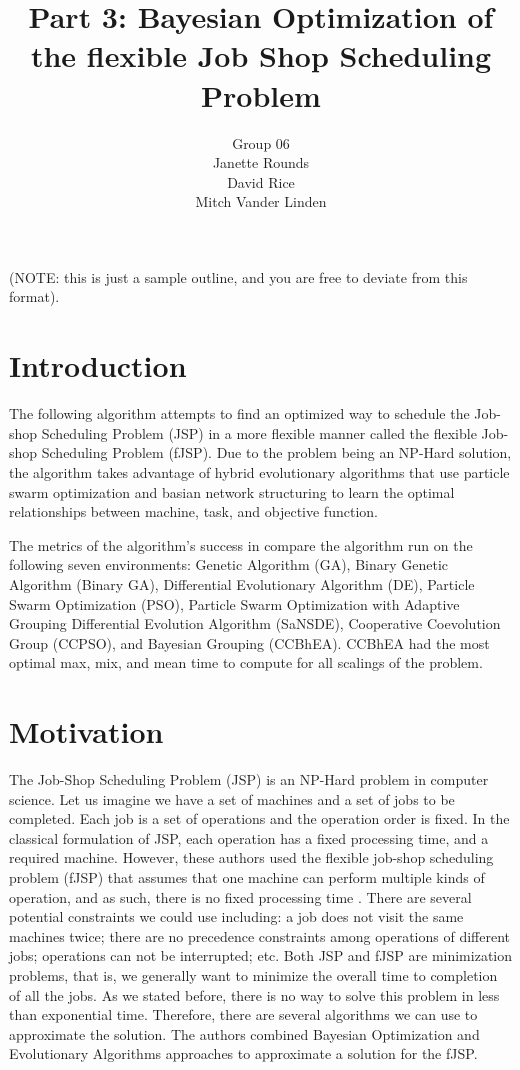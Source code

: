 \documentclass[11pt]{article}
\title{Part 3: Bayesian Optimization of the flexible Job Shop Scheduling Problem}
\author{Group 06 \\ 
\small Janette Rounds \\ \small David Rice \\ \small Mitch Vander Linden}
\begin{document}
\maketitle

(NOTE: this is just a sample outline, and you are free to deviate from this 
format).

\section{Introduction}
The following algorithm attempts to find an optimized way to schedule the Job-shop Scheduling Problem (JSP) in a more flexible manner called the flexible Job-shop Scheduling Problem (fJSP). Due to the problem being an NP-Hard solution, the algorithm takes advantage of hybrid evolutionary algorithms that use particle swarm optimization and basian network structuring to learn the optimal relationships between machine, task, and objective function. 

The metrics of the algorithm's success in \cite{sun2015bayesian} compare the algorithm run on the following seven environments: Genetic Algorithm (GA), Binary Genetic Algorithm (Binary GA), Differential Evolutionary Algorithm (DE), Particle Swarm Optimization (PSO), Particle Swarm Optimization with Adaptive Grouping Differential Evolution Algorithm (SaNSDE), Cooperative Coevolution Group (CCPSO), and Bayesian Grouping (CCBhEA). CCBhEA had the most optimal max, mix, and mean time to compute for all scalings of the problem.

\section{Motivation}
The Job-Shop Scheduling Problem (JSP) is an NP-Hard problem in computer science\cite{cheng1996tutorial}. Let us imagine we have a set of machines and a set of jobs to be completed. Each job is a set of operations and the operation order is fixed. In the classical formulation of JSP, each operation has a fixed processing time, and a required machine. However, these authors used the flexible job-shop scheduling problem (fJSP) that assumes that one machine can perform multiple kinds of operation, and as such, there is no fixed processing time \cite{sun2015bayesian}. There are several potential constraints we could use including: a job does not visit the same machines twice; there are no precedence constraints among operations of different jobs; operations can not be interrupted; etc. Both JSP and fJSP are minimization problems, that is, we generally want to minimize the overall time to completion of all the jobs. As we stated before, there is no way to solve this problem in less than exponential time. Therefore, there are several algorithms we can use to approximate the solution. The authors combined Bayesian Optimization and Evolutionary Algorithms approaches to approximate a solution for the fJSP. 
\end{document}
